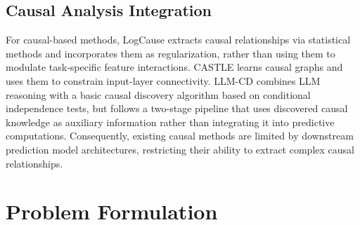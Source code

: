 \documentclass[conference]{IEEEtran}
\newcommand{\vldb}[1]{{\color{black}#1}}
\newcommand{\zjic}[1]{{\color{black}#1}}
\newcommand{\syic}[1]{{\color{black}#1}}
\newcommand*{\ourmodel}{TEAL}
\begin{document}
\subsection{\syic{Causal Analysis Integration}}

\syic{For causal-based methods,} LogCause \cite{r:linear} extracts causal relationships via statistical methods and incorporates them as regularization, \syic{rather than using them to modulate task-specific feature interactions}. \zjic{CASTLE \cite{r:CASTLE} learns causal graphs and uses them to constrain input-layer connectivity.} 
LLM-CD \cite{r:llmcd} combines LLM reasoning with a basic causal discovery algorithm based on conditional independence tests, but \syic{follows a two-stage pipeline that uses discovered causal knowledge as auxiliary information rather than integrating it into predictive computations}.
\vldb{Consequently,} existing causal methods are limited by \vldb{downstream prediction model architectures}, restricting their ability to extract complex causal relationships.

\section{Problem Formulation}
\end{document}
